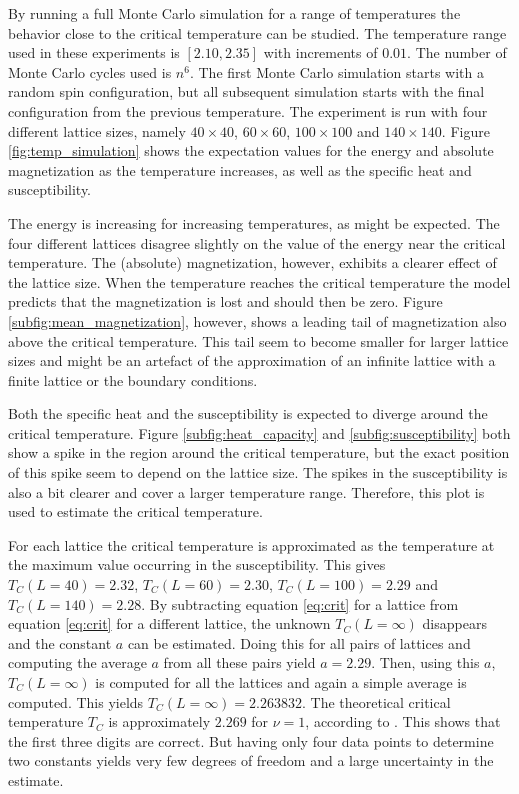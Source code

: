 \documentclass{article}
\begin{document}
By running a full Monte Carlo simulation for a range of temperatures the behavior close to the critical temperature can be studied. The temperature range used in these experiments is $[2.10, 2.35]$ with increments of $0.01$. The number of Monte Carlo cycles used is $n^6$. The first Monte Carlo simulation starts with a random spin configuration, but all subsequent simulation starts with the final configuration from the previous temperature. The experiment is run with four different lattice sizes, namely $40 \times 40$, $60 \times 60$, $100 \times 100$ and $140 \times 140$. Figure \ref{fig:temp_simulation} shows the expectation values for the energy and absolute magnetization as the temperature increases, as well as the specific heat and susceptibility. 

The energy is increasing for increasing temperatures, as might be expected. The four different lattices disagree slightly on the value of the energy near the critical temperature. The (absolute) magnetization, however, exhibits a clearer effect of the lattice size. When the temperature reaches the critical temperature the model predicts that the magnetization is lost and should then be zero. Figure \ref{subfig:mean_magnetization}, however, shows a leading tail of magnetization also above the critical temperature. This tail seem to become smaller for larger lattice sizes and might be an artefact of the approximation of an infinite lattice with a finite lattice or the boundary conditions.

Both the specific heat and the susceptibility is expected to diverge around the critical temperature. Figure \ref{subfig:heat_capacity} and \ref{subfig:susceptibility} both show a spike in the region around the critical temperature, but the exact position of this spike seem to depend on the lattice size. The spikes in the susceptibility is also a bit clearer and cover a larger temperature range. Therefore, this plot is used to estimate the critical temperature. 

For each lattice the critical temperature is approximated as the temperature at the maximum value occurring in the susceptibility. This gives $T_C(L=40)=2.32$, $T_C(L=60)=2.30$, $T_C(L=100)=2.29$ and $T_C(L=140)=2.28$. By subtracting equation \ref{eq:crit} for a lattice from equation \ref{eq:crit} for a different lattice, the unknown $T_C(L=\infty)$ disappears and the constant $a$ can be estimated. Doing this for all pairs of lattices and computing the average $a$ from all these pairs yield $a= 2.29$. Then, using this $a$, $T_C(L=\infty)$ is computed for all the lattices and again a simple average is computed. This yields $T_C(L=\infty)= 2.263832$. The theoretical critical temperature $T_C$ is approximately $2.269$ for $\nu=1$, according to \cite{onsager}. This shows that the first three digits are correct. But having only four data points to determine two constants yields very few degrees of freedom and a large uncertainty in the estimate. 
\end{document}
